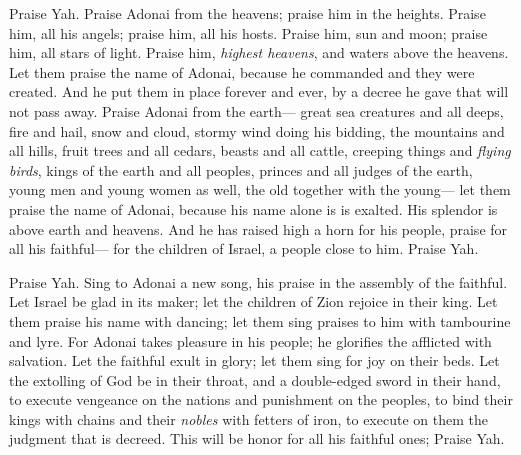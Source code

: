 \begin{biblechapter} %
 Praise Yah. 
Praise Adonai from the heavens; 
praise him in the heights.
\verse Praise him, all his angels; 
praise him, all his hosts.
\verse Praise him, sun and moon; 
praise him, all stars of light.
\verse Praise him, \textit{highest heavens}, 
and waters above the heavens.
\verse Let them praise the name of Adonai, 
because he commanded and they were created.
\verse And he put them in place forever and ever, 
by a decree he gave that will not pass away.
\verse Praise Adonai from the earth— 
great sea creatures and all deeps,
\verse fire and hail, snow and cloud, 
stormy wind doing his bidding,
\verse the mountains and all hills, 
fruit trees and all cedars,
\verse beasts and all cattle, 
creeping things and \textit{flying birds},
\verse kings of the earth and all peoples, 
princes and all judges of the earth,
\verse young men and young women as well, 
the old together with the young—
\verse let them praise the name of Adonai, 
because his name alone is is exalted. 
His splendor is above earth and heavens.
\verse And he has raised high a horn for his people, 
praise for all his faithful— 
for the children of Israel, 
a people close to him. 
Praise Yah.
\end{biblechapter}

\begin{biblechapter} %
 Praise Yah. 
Sing to Adonai a new song, 
his praise in the assembly of the faithful.
\verse Let Israel be glad in its maker; 
let the children of Zion rejoice in their king.
\verse Let them praise his name with dancing; 
let them sing praises to him with tambourine and lyre.
\verse For Adonai takes pleasure in his people; 
he glorifies the afflicted with salvation.
\verse Let the faithful exult in glory; 
let them sing for joy on their beds.
\verse Let the extolling of God be in their throat, 
and a double-edged sword in their hand,
\verse to execute vengeance on the nations 
and punishment on the peoples,
\verse to bind their kings with chains 
and their \textit{nobles} with fetters of iron,
\verse to execute on them the judgment that is decreed. 
This will be honor for all his faithful ones; 
Praise Yah.
\end{biblechapter}

